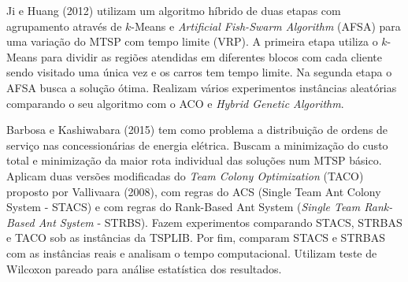 Ji e Huang (2012) \cite{ji2012} utilizam um algoritmo híbrido de duas etapas com agrupamento através de $k$-Means e \textit{Artificial Fish-Swarm Algorithm} (AFSA) para uma variação do MTSP com tempo limite (VRP). A primeira etapa utiliza o $k$-Means para dividir as regiões atendidas em diferentes blocos com cada cliente sendo visitado uma única vez e os carros tem tempo limite. Na segunda etapa o AFSA busca a solução ótima. Realizam vários experimentos instâncias aleatórias comparando o seu algoritmo com o ACO e \textit{Hybrid Genetic Algorithm}.

Barbosa e Kashiwabara (2015) \cite{barbosa2015aplicaccao} tem como problema a distribuição de ordens de serviço nas concessionárias de energia elétrica. Buscam a minimização do custo total e minimização da maior rota individual das soluções num MTSP básico. Aplicam duas versões modificadas do \textit{Team Colony Optimization} (TACO) proposto por Vallivaara (2008), com regras do ACS (Single Team Ant Colony System - STACS) e com regras do Rank-Based Ant System (\textit{Single Team Rank-Based Ant System} - STRBS). Fazem experimentos comparando STACS, STRBAS e TACO sob as instâncias da TSPLIB. Por fim, comparam STACS e STRBAS com as instâncias reais e analisam o tempo computacional. Utilizam teste de Wilcoxon pareado para análise estatística dos resultados.
